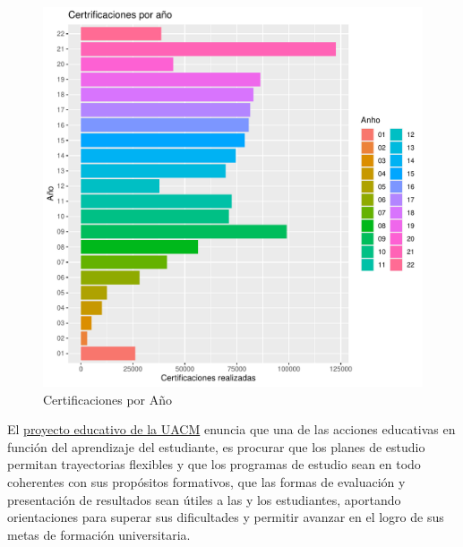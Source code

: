 \documentclass[12pt]{article}
\begin{document}
\begin{figure}
\centering
\includegraphics[scale=0.45]{Graficas/ggplotBarplotAnho.pdf}
\caption{Certificaciones por A\~no}
\label{Fig.Cert.Anho}
\end{figure}


El \href{https://drive.google.com/file/d/0B6AEksrqo4h1M2Q5OWVhOGEtODNlNy00M2M2LThkNTctZjE0ZjA4ZGJlZWZj/view?resourcekey=0-9eA5mzOWlPqKF8MTeYH9Iw}{proyecto educativo de la UACM} enuncia que una de las acciones educativas en funci\'on del aprendizaje del estudiante, es procurar que los planes de estudio permitan trayectorias flexibles y que los programas de estudio sean en todo coherentes con sus prop\'ositos formativos, que las formas de evaluaci\'on y presentaci\'on de resultados sean \'utiles a las y los estudiantes, aportando orientaciones  para superar sus dificultades y permitir avanzar en el logro de sus metas de formaci\'on universitaria.
\end{document}
